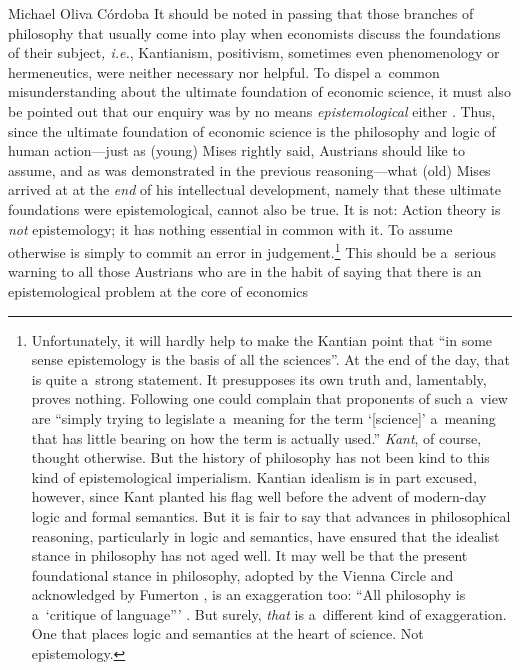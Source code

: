 \begin{artengenv}{Michael Oliva Córdoba}
It should be noted in passing that those branches of philosophy that usually come into play when economists discuss the foundations of their subject\textit{, i.e.}, Kantianism, positivism, sometimes even phenomenology or hermeneutics, were neither necessary nor helpful. To dispel a~common misunderstanding about the ultimate foundation of economic science, it must also be pointed out that our enquiry was by no means \textit{epistemological} either 
\parencite*[\textit{pace}][]{mises_ultimate_1962}. %
 Thus, since the ultimate foundation of economic science is the philosophy and logic of human action---just as (young) Mises rightly said, Austrians should like to assume, and as was demonstrated in the previous reasoning---what (old) Mises arrived at at the \textit{end} of his intellectual development, namely that these ultimate foundations were epistemological, cannot also be true. It is not: Action theory is \textit{not} epistemology; it has nothing essential in common with it. To assume otherwise is simply to commit an error in judgement.\footnote{Unfortunately, it will hardly help to make the Kantian point that ``in some sense epistemology is the basis of all the sciences''. At the end of the day, that is quite a~strong statement. It presupposes its own truth and, lamentably, proves nothing. Following 
\parencite[][p.3]{fumerton_epistemology_2017} %
 one could complain that proponents of such a~view are ``simply trying to legislate a~meaning for the term ‘[science]' a~meaning that has little bearing on how the term is actually used.'' \textit{Kant}, of course, thought otherwise. But the history of philosophy has not been kind to this kind of epistemological imperialism. Kantian idealism is in part excused, however, since Kant planted his flag well before the advent of modern-day logic and formal semantics. But it is fair to say that advances in philosophical reasoning, particularly in logic and semantics, have ensured that the idealist stance in philosophy has not aged well. It may well be that the present foundational stance in philosophy, adopted by the Vienna Circle and acknowledged by Fumerton 
\parencite*[][p.14]{fumerton_epistemology_2017}, %
 is an exaggeration too: ``All philosophy is a~‘critique of language''' 
\parencites[][]{wittgenstein_tractatus_1922}[][4.0031]{wittgenstein2013tractatus}. %
 But surely, \textit{that} is a~different kind of exaggeration. One that places logic and semantics at the heart of science. Not epistemology.} This should be a~serious warning to all those Austrians who are in the habit of saying that there is an epistemological problem at the core of economics 

\end{artengenv}
